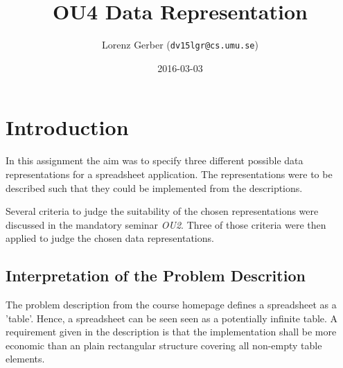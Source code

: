 \documentclass[a4paper,11pt,twoside]{article}
\title{OU4 Data Representation}
\author{Lorenz Gerber ({\tt{dv15lgr@cs.umu.se}})}
\date{2016-03-03}
\begin{document}
\lstset{language=C}
\maketitle

\tableofcontents
\newpage

\section{Introduction} 
In this assignment the aim was to specify three different possible
data representations for a spreadsheet application. The
representations were to be described such that they could be implemented
from the descriptions.
 
Several criteria to judge the suitability of the chosen representations were 
discussed in the mandatory seminar \emph{OU2}. Three of those criteria 
were then applied to judge the chosen data representations.




\subsection{Interpretation of the Problem Descrition}
The problem description from the course homepage defines a spreadsheet
as a 'table'. Hence, a spreadsheet can be seen seen as a potentially
infinite table. A requirement given in the description is that the
implementation shall be more economic than an plain rectangular
structure covering all non-empty table elements.
\end{document}
